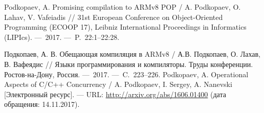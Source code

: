 \renewcommand{\refname}{Статьи в изданиях, входящих в базы цитирования Web of Science и Scopus}
\begin{thebibliography}{99}
\setcounter{enumiv}{\value{firstbib}}
 Podkopaev, A. Promising compilation to ARMv8 POP / A. Podkopaev, O. Lahav, V. Vafeiadis // 31st European Conference on Object-Oriented Programming (ECOOP 17), Leibniz International Proceedings in Informatics (LIPIcs).  ---~2017. ---~P.~22:1--22:28.
\setcounter{firstbib}{\value{enumiv}}
\end{thebibliography}

\renewcommand{\refname}{Статьи в других изданиях}
\begin{thebibliography}{99}
\setcounter{enumiv}{\value{firstbib}}
 Подкопаев, А. В. Обещающая компиляция в ARMv8 / А.В. Подкопаев, О. Лахав, В. Вафеядис // Языки программирования и компиляторы. Труды конференции. Ростов-на-Дону, Россия. ---~2017. ---~C.~223--226.
 Podkopaev, A. Operational Aspects of {C/C++} Concurrency / A. Podkopaev, I. Sergey, A. Nanevski
  [Электронный ресурс]. --- URL: \url{http://arxiv.org/abs/1606.01400} (дата обращения: 14.11.2017).
\end{thebibliography}
